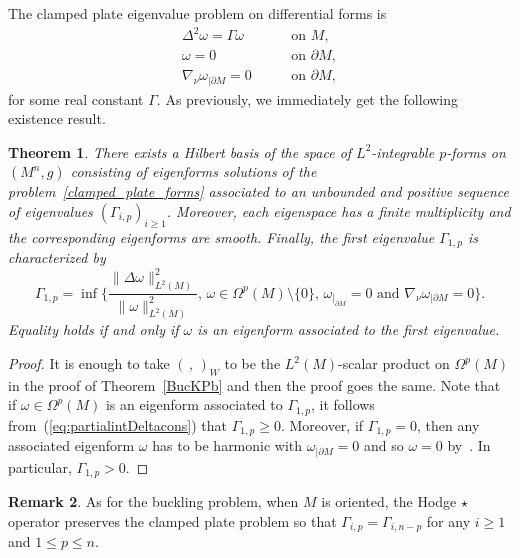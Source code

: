 \documentclass[10pt,a4paper]{amsart}
\numberwithin{equation}{section}
\newtheorem{Theorem}{Theorem}[section]
\theoremstyle{definition}
\newtheorem{Remark}[Theorem]{Remark}
\begin{document}
The clamped plate eigenvalue problem on differential forms is
\begin{equation}\label{clamped_plate_forms}
\begin{aligned}
&\Delta^2 \omega=\Gamma \omega \ \quad&&\textrm{on } M,\\
&\omega =0 \ \quad&&\textrm{on }\partial M,&\\
&\nabla_\nu\omega_{|\partial M}=0 \ \quad &&\textrm{on }\partial M,
\end{aligned}
\end{equation}
for some real constant $\Gamma$. As previously, we immediately get the following existence result.
\begin{Theorem}\label{CP_Pb}
There exists a Hilbert basis of the space of $L^2$-integrable $p$-forms on $(M^n,g)$ consisting of eigenforms solutions of the problem~\eqref{clamped_plate_forms} associated to an unbounded and positive sequence of eigenvalues $(\Gamma_{i,p})_{i\geq 1}$. Moreover, each eigenspace has a finite multiplicity and the corresponding eigenforms are smooth. Finally, the first eigenvalue $\Gamma_{1,p}$ is characterized by
\begin{equation}\label{eq:charcp}
\Gamma_{1,p}=\inf\Biggl\{\frac{\|\Delta\omega\|_{L^2(M)}^2}{
\| \omega\|_{L^2(M)}^2},\, \omega\in\Omega^p(M)\setminus\{0\},\, \omega_{|_{\partial
M}}=0\textrm{ and }\nabla_\nu\omega_{|\partial M}=0\Biggr\}.
\end{equation}
Equality holds if and only if $\omega$ is an eigenform associated to the first eigenvalue.
\end{Theorem}

\begin{proof} It is enough to take $(\,,\,)_W$ to be the $L^2(M)$-scalar product on $\Omega^p(M)$ in the proof of Theorem~\ref{BucKPb} and then the proof goes the same. Note that if $\omega\in\Omega^p(M)$ is an eigenform associated to $\Gamma_{1,p}$, it follows from~(\ref{eq:partialintDeltacons}) that $\Gamma_{1,p}\geq 0$. Moreover, if $\Gamma_{1,p}=0$, then any associated eigenform $\omega$ has to be harmonic with $\omega_{|\partial M}=0$ and so $\omega=0$ by~\cite{Anne89}. In particular, $\Gamma_{1,p}>0$.
\end{proof}

\begin{Remark}
As for the buckling problem, when $M$ is oriented, the Hodge $\star$ operator preserves the clamped plate problem so that $\Gamma_{i,p}=\Gamma_{i,n-p}$ for any $i\geq 1$ and $1\leq p\leq n$.
\end{Remark}
\end{document}
